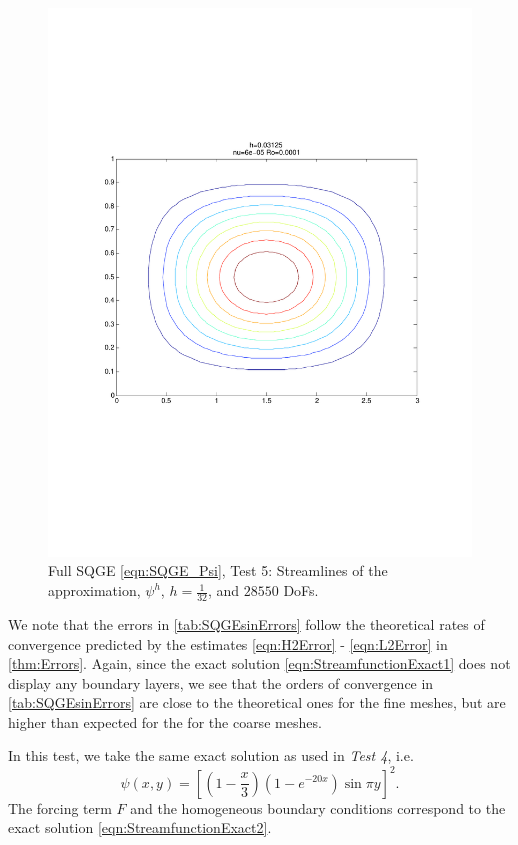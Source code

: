 \begin{figure}%
  \begin{center}
    \includegraphics[trim=0 200 20 215, clip=true, scale=0.5]{SQGEsin.pdf}
    \caption{Full SQGE \eqref{eqn:SQGE_Psi}, Test 5: Streamlines of the approximation,
    $\psi^h$, $h=\frac{1}{32}$, and $28550$ DoFs.}
    \label{fig:SQGEsin}
  \end{center}
\end{figure}

We note that the errors in \autoref{tab:SQGEsinErrors} follow the theoretical rates of convergence
predicted by the estimates \eqref{eqn:H2Error} - \eqref{eqn:L2Error} in \autoref{thm:Errors}. Again,
since the exact solution \eqref{eqn:StreamfunctionExact1} does not display any boundary layers, we
see that the orders of convergence in \autoref{tab:SQGEsinErrors} are close to the theoretical ones for the fine meshes, but are higher
than expected for the for the coarse meshes.

In this test, we take the same exact solution as used in \emph{Test 4}, i.e.
\begin{equation}
  \psi(x,y) = \left[\left(1 - \frac{x}{3}\right)\left(1-e^{-20x}\right) \sin \pi y\right]^2.
  \label{eqn:StreamfunctionExact2}
\end{equation}
The forcing term $F$ and the homogeneous boundary conditions correspond to the exact solution
\eqref{eqn:StreamfunctionExact2}.

